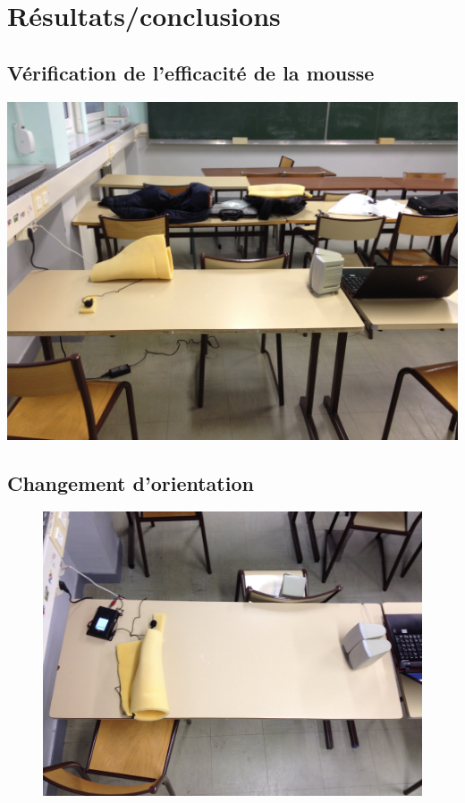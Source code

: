 \section{Résultats/conclusions}


\subsection{Vérification de l'efficacité de la mousse}
\includegraphics[width=\textwidth]{../tests/test_du_protocole/cone_face.jpg} 

\subsection{Changement d'orientation}


\begin{figure}[H]
\includegraphics[width=\textwidth]{../tests/test_du_protocole/cone_dos_a_dos.jpg} 
\end{figure}


